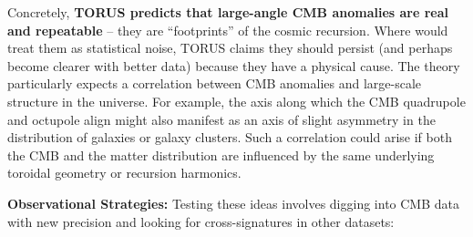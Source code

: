 \documentclass[
]{article}
\begin{document}
{Concretely, \textbf{TORUS predicts that large-angle CMB anomalies are
real and repeatable} -- they are ``footprints'' of the cosmic recursion.
Where \LambdaCDM would treat them as statistical noise, TORUS claims they
should persist (and perhaps become clearer with better data) because
they have a physical cause\hspace{0pt}. The theory particularly expects
a correlation between CMB anomalies and large-scale structure in the
universe\hspace{0pt}. For example, the axis along which the CMB
quadrupole and octupole align might also manifest as an axis of slight
asymmetry in the distribution of galaxies or galaxy clusters. Such a
correlation could arise if both the CMB and the matter distribution are
influenced by the same underlying toroidal geometry or recursion
harmonics.

\textbf{Observational Strategies:} Testing these ideas involves digging
into CMB data with new precision and looking for cross-signatures in
other datasets:

}
\end{document}
